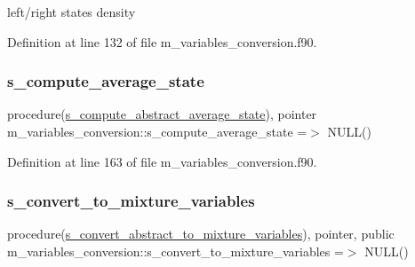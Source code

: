 left/right states density 



Definition at line 132 of file m\+\_\+variables\+\_\+conversion.\+f90.

\mbox{\label{namespacem__variables__conversion_a2071f3e7e4336e3e87f259e72ccdb8b1}} 
\subsubsection{\texorpdfstring{s\+\_\+compute\+\_\+average\+\_\+state}{s\_compute\_average\_state}}
{\footnotesize\ttfamily procedure(\hyperlink{interfacem__variables__conversion_1_1s__compute__abstract__average__state}{s\+\_\+compute\+\_\+abstract\+\_\+average\+\_\+state}), pointer m\+\_\+variables\+\_\+conversion\+::s\+\_\+compute\+\_\+average\+\_\+state =$>$ N\+U\+LL()}



Definition at line 163 of file m\+\_\+variables\+\_\+conversion.\+f90.

\mbox{\label{namespacem__variables__conversion_a2f790d774fdcc87779b89a71ae3f2674}} 
\subsubsection{\texorpdfstring{s\+\_\+convert\+\_\+to\+\_\+mixture\+\_\+variables}{s\_convert\_to\_mixture\_variables}}
{\footnotesize\ttfamily procedure(\hyperlink{interfacem__variables__conversion_1_1s__convert__abstract__to__mixture__variables}{s\+\_\+convert\+\_\+abstract\+\_\+to\+\_\+mixture\+\_\+variables}), pointer, public m\+\_\+variables\+\_\+conversion\+::s\+\_\+convert\+\_\+to\+\_\+mixture\+\_\+variables =$>$ N\+U\+LL()}



